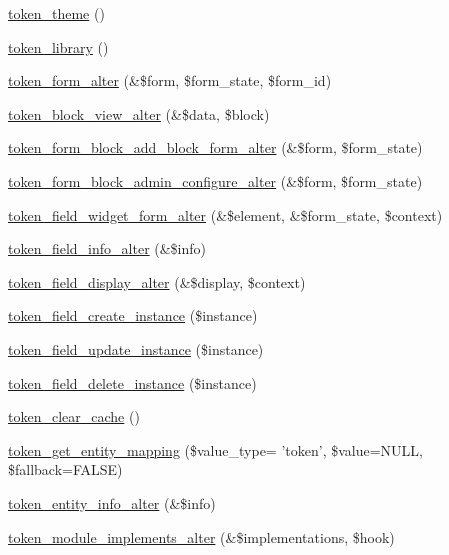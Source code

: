 \begin{DoxyCompactItemize}
\item 
\hyperlink{token_8module_a6689af0bf91fa39c1859c95b59aafd5a}{token\_\-theme} ()
\item 
\hyperlink{token_8module_afabac2b6ac5ef102cd598b1b5e940f78}{token\_\-library} ()
\item 
\hyperlink{token_8module_a6cb9dc162c6317ddc6edbc64acbc12e0}{token\_\-form\_\-alter} (\&\$form, \$form\_\-state, \$form\_\-id)
\item 
\hyperlink{token_8module_a5e30af58ef42a9fb1b3d3723e2796c9d}{token\_\-block\_\-view\_\-alter} (\&\$data, \$block)
\item 
\hyperlink{token_8module_a7a29ce869431da05b8fc1f92bde7f655}{token\_\-form\_\-block\_\-add\_\-block\_\-form\_\-alter} (\&\$form, \$form\_\-state)
\item 
\hyperlink{token_8module_aae92360a59b14abf3de3aad884459bbc}{token\_\-form\_\-block\_\-admin\_\-configure\_\-alter} (\&\$form, \$form\_\-state)
\item 
\hyperlink{token_8module_a5f0558b9a02d03e37b242199ab380174}{token\_\-field\_\-widget\_\-form\_\-alter} (\&\$element, \&\$form\_\-state, \$context)
\item 
\hyperlink{token_8module_af9c21176f345bfcac32fc7628f06bc1a}{token\_\-field\_\-info\_\-alter} (\&\$info)
\item 
\hyperlink{token_8module_a27b0b8c059ec8a469a124e574ac1a9bc}{token\_\-field\_\-display\_\-alter} (\&\$display, \$context)
\item 
\hyperlink{token_8module_a33b88bb88f338a9d37ea10b260caac36}{token\_\-field\_\-create\_\-instance} (\$instance)
\item 
\hyperlink{token_8module_a444dc40d459c42573e310276c66b1389}{token\_\-field\_\-update\_\-instance} (\$instance)
\item 
\hyperlink{token_8module_aabb4f403262fe33845a9644fef38feb4}{token\_\-field\_\-delete\_\-instance} (\$instance)
\item 
\hyperlink{token_8module_ac9fcda26ddadebfc7f94485fc20a3c3e}{token\_\-clear\_\-cache} ()
\item 
\hyperlink{token_8module_a44ada8bf0431313606adce0148b29b82}{token\_\-get\_\-entity\_\-mapping} (\$value\_\-type= 'token', \$value=NULL, \$fallback=FALSE)
\item 
\hyperlink{token_8module_a9015db039cba923ed4bb1167faa8a4a8}{token\_\-entity\_\-info\_\-alter} (\&\$info)
\item 
\hyperlink{token_8module_aa9de071c35f0534b7d316f25bea3c6f1}{token\_\-module\_\-implements\_\-alter} (\&\$implementations, \$hook)

\end{DoxyCompactItemize}
